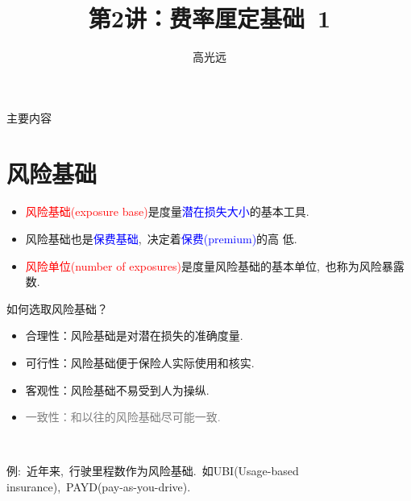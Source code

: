 \documentclass[professionalfont]{beamer}
\title{第2讲：费率厘定基础~1}
\author{高光远}
\institute{中国人民大学~统计学院}
\date{}
\newcommand{\red}[1]{\textcolor{red}{#1}}
\newcommand{\blue}[1]{\textcolor{blue}{#1}}
\newcommand{\gray}[1]{\textcolor{gray}{#1}}
\begin{document}
\begin{frame}
	\titlepage
\end{frame}

\begin{frame}{主要内容}
	\tableofcontents
\end{frame}



\section{风险基础}
	\begin{frame}
	\begin{itemize}
		\item \red{风险基础(exposure base)}是度量\blue{潜在损失大小}的基本工具.
		\item 风险基础也是\blue{保费基础},~决定着\blue{保费(premium)}的高
		低.
		\item \red{风险单位(number of exposures)}是度量风险基础的基本单位,~也称为风险暴露数.
		\end{itemize}	
	\end{frame}
		\begin{frame}{如何选取风险基础？}
		\begin{itemize}
		\item 合理性：风险基础是对潜在损失的准确度量.
		\item 可行性：风险基础便于保险人实际使用和核实.
		\item 客观性：风险基础不易受到人为操纵.
		\item\gray{一致性：和以往的风险基础尽可能一致.}
	    \end{itemize}	
	    
	    ~
	    
	    例:~近年来,~行驶里程数作为风险基础.~如UBI(Usage-based insurance),~PAYD(pay-as-you-drive).
	    
  
		\end{frame}
\end{document}
